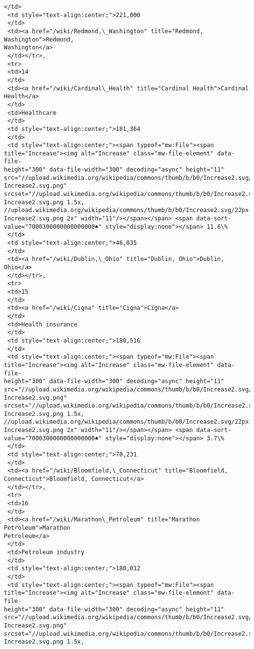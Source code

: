 \documentclass[11pt]{article}
\begin{document}
\begin{tcolorbox}[breakable, size=fbox, boxrule=.5pt, pad at break*=1mm, opacityfill=0]
\begin{Verbatim}[commandchars=\\\{\}]
 </td>
 <td style="text-align:center;">221,000
 </td>
 <td><a href="/wiki/Redmond,\_Washington" title="Redmond, Washington">Redmond,
Washington</a>
 </td></tr>,
 <tr>
 <td>14
 </td>
 <td><a href="/wiki/Cardinal\_Health" title="Cardinal Health">Cardinal Health</a>
 </td>
 <td>Healthcare
 </td>
 <td style="text-align:center;">181,364
 </td>
 <td style="text-align:center;"><span typeof="mw:File"><span
title="Increase"><img alt="Increase" class="mw-file-element" data-file-
height="300" data-file-width="300" decoding="async" height="11"
src="//upload.wikimedia.org/wikipedia/commons/thumb/b/b0/Increase2.svg/11px-
Increase2.svg.png"
srcset="//upload.wikimedia.org/wikipedia/commons/thumb/b/b0/Increase2.svg/17px-
Increase2.svg.png 1.5x,
//upload.wikimedia.org/wikipedia/commons/thumb/b/b0/Increase2.svg/22px-
Increase2.svg.png 2x" width="11"/></span></span> <span data-sort-
value="7000300000000000000♠" style="display:none"></span> 11.6\%
 </td>
 <td style="text-align:center;">46,035
 </td>
 <td><a href="/wiki/Dublin,\_Ohio" title="Dublin, Ohio">Dublin, Ohio</a>
 </td></tr>,
 <tr>
 <td>15
 </td>
 <td><a href="/wiki/Cigna" title="Cigna">Cigna</a>
 </td>
 <td>Health insurance
 </td>
 <td style="text-align:center;">180,516
 </td>
 <td style="text-align:center;"><span typeof="mw:File"><span
title="Increase"><img alt="Increase" class="mw-file-element" data-file-
height="300" data-file-width="300" decoding="async" height="11"
src="//upload.wikimedia.org/wikipedia/commons/thumb/b/b0/Increase2.svg/11px-
Increase2.svg.png"
srcset="//upload.wikimedia.org/wikipedia/commons/thumb/b/b0/Increase2.svg/17px-
Increase2.svg.png 1.5x,
//upload.wikimedia.org/wikipedia/commons/thumb/b/b0/Increase2.svg/22px-
Increase2.svg.png 2x" width="11"/></span></span> <span data-sort-
value="7000300000000000000♠" style="display:none"></span> 3.7\%
 </td>
 <td style="text-align:center;">70,231
 </td>
 <td><a href="/wiki/Bloomfield,\_Connecticut" title="Bloomfield,
Connecticut">Bloomfield, Connecticut</a>
 </td></tr>,
 <tr>
 <td>16
 </td>
 <td><a href="/wiki/Marathon\_Petroleum" title="Marathon Petroleum">Marathon
Petroleum</a>
 </td>
 <td>Petroleum industry
 </td>
 <td style="text-align:center;">180,012
 </td>
 <td style="text-align:center;"><span typeof="mw:File"><span
title="Increase"><img alt="Increase" class="mw-file-element" data-file-
height="300" data-file-width="300" decoding="async" height="11"
src="//upload.wikimedia.org/wikipedia/commons/thumb/b/b0/Increase2.svg/11px-
Increase2.svg.png"
srcset="//upload.wikimedia.org/wikipedia/commons/thumb/b/b0/Increase2.svg/17px-
Increase2.svg.png 1.5x,

\end{Verbatim}
\end{tcolorbox}
\end{document}

